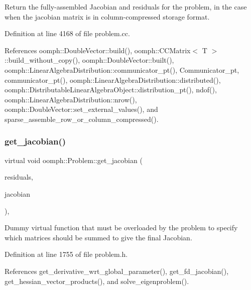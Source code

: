 Return the fully-\/assembled Jacobian and residuals for the problem, in the case when the jacobian matrix is in column-\/compressed storage format. 

Definition at line 4168 of file problem.\+cc.



References oomph\+::\+Double\+Vector\+::build(), oomph\+::\+C\+C\+Matrix$<$ T $>$\+::build\+\_\+without\+\_\+copy(), oomph\+::\+Double\+Vector\+::built(), oomph\+::\+Linear\+Algebra\+Distribution\+::communicator\+\_\+pt(), Communicator\+\_\+pt, communicator\+\_\+pt(), oomph\+::\+Linear\+Algebra\+Distribution\+::distributed(), oomph\+::\+Distributable\+Linear\+Algebra\+Object\+::distribution\+\_\+pt(), ndof(), oomph\+::\+Linear\+Algebra\+Distribution\+::nrow(), oomph\+::\+Double\+Vector\+::set\+\_\+external\+\_\+values(), and sparse\+\_\+assemble\+\_\+row\+\_\+or\+\_\+column\+\_\+compressed().

\mbox{\label{classoomph_1_1Problem_a0db16f9bcac7af964d0fecc8b6a5ea63}} 
\subsubsection{\texorpdfstring{get\+\_\+jacobian()}{get\_jacobian()}\hspace{0.1cm}{\footnotesize\ttfamily [4/4]}}
{\footnotesize\ttfamily virtual void oomph\+::\+Problem\+::get\+\_\+jacobian (\begin{DoxyParamCaption}\item[{\hyperlink{classoomph_1_1DoubleVector}{Double\+Vector} \&}]{residuals,  }\item[{\hyperlink{classoomph_1_1SumOfMatrices}{Sum\+Of\+Matrices} \&}]{jacobian }\end{DoxyParamCaption})\hspace{0.3cm}{\ttfamily [inline]}, {\ttfamily [virtual]}}



Dummy virtual function that must be overloaded by the problem to specify which matrices should be summed to give the final Jacobian. 



Definition at line 1755 of file problem.\+h.



References get\+\_\+derivative\+\_\+wrt\+\_\+global\+\_\+parameter(), get\+\_\+fd\+\_\+jacobian(), get\+\_\+hessian\+\_\+vector\+\_\+products(), and solve\+\_\+eigenproblem().

